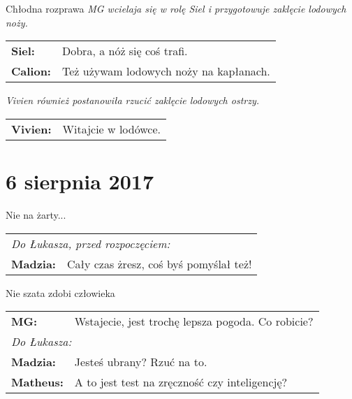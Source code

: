 \documentclass[10pt,twoside,twocolumn]{book}
\begin{document}
\begin{rpg-quotebox}{Chłodna rozprawa}
   \textit{MG wcielaja się w rolę Siel i przygotowuje zaklęcie lodowych noży.} \\

   \begin{tabularx}{\columnwidth}{lX}
      \textbf{Siel:} & Dobra, a nóż się coś trafi.\\
      \textbf{Calion:} & Też używam lodowych noży na kapłanach.\\
   \end{tabularx}
   \newline

   \textit{Vivien również postanowiła rzucić zaklęcie lodowych ostrzy.}\\

   \begin{tabularx}{\columnwidth}{lX}
      \textbf{Vivien:} & Witajcie w lodówce.\\
   \end{tabularx}
\end{rpg-quotebox}

\section*{6 sierpnia 2017}

\begin{rpg-quotebox}{Nie na żarty...}
   \begin{tabularx}{\columnwidth}{lX}
      \multicolumn{2}{l}{\textit{Do Łukasza, przed rozpoczęciem:}}\\
      \textbf{Madzia:} & Cały czas żresz, coś byś pomyślał też!\\
   \end{tabularx}
\end{rpg-quotebox}

\begin{rpg-quotebox}{Nie szata zdobi człowieka}
   \begin{tabularx}{\columnwidth}{lX}
      \textbf{MG:} & Wstajecie, jest trochę lepsza pogoda. Co robicie?\\
      \multicolumn{2}{l}{\textit{Do Łukasza:}}\\
      \textbf{Madzia:} & Jesteś ubrany? Rzuć na to.\\
      \textbf{Matheus:} & A to jest test na zręczność czy inteligencję?\\
   \end{tabularx}
\end{rpg-quotebox}
\end{document}
